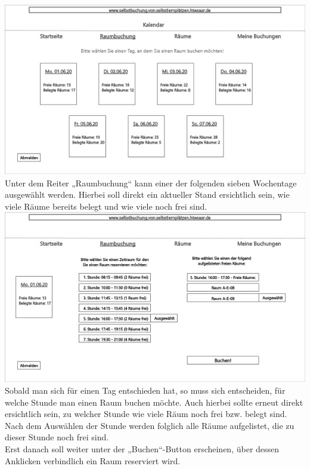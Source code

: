 \documentclass[a4paper,12pt]{article}
\begin{document}
\includegraphics{Bilder/UI5}\label{UI_5}\\

Unter dem Reiter „Raumbuchung“ kann einer der folgenden sieben Wochentage ausgewählt werden. Hierbei soll direkt ein aktueller Stand ersichtlich sein, wie viele Räume bereits belegt und wie viele noch frei sind.\\

\includegraphics{Bilder/UI6}\label{UI_6}\\

Sobald man sich für einen Tag entschieden hat, so muss sich entscheiden, für welche Stunde man einen Raum buchen möchte. Auch hierbei sollte erneut direkt ersichtlich sein, zu welcher Stunde wie viele Räum noch frei bzw. belegt sind.\\ 
Nach dem Auswählen der Stunde werden folglich alle Räume aufgelistet, die zu dieser Stunde noch frei sind.\\
Erst danach soll weiter unter der „Buchen“-Button erscheinen, über dessen Anklicken verbindlich ein Raum reserviert wird.\\
\end{document}
